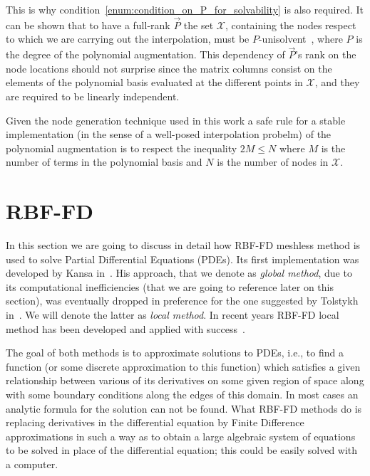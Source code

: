 This is why condition~\ref{enum:condition_on_P_for_solvability} is also required. It can be shown that to have a full-rank $\vec{P}$ the set $\mathcal{X}$, containing the nodes respect to which we are carrying out the interpolation, must be $P$-unisolvent~\cite{Fasshauer:details_on_basic_functions}, where $P$ is the degree of the polynomial augmentation. This dependency of $\vec{P}$'s rank on the node locations should not surprise since the matrix columns consist on the elements of the polynomial basis evaluated at the different points in $\mathcal{X}$, and they are required to be linearly independent.

Given the node generation technique used in this work a safe rule for a stable implementation (in the sense of a well-posed interpolation probelm) of the polynomial augmentation is to respect the inequality $2M \le N$ where $M$ is the number of terms in the polynomial basis and $N$ is the number of nodes in $\mathcal{X}$.



\section{RBF-FD}
\label{sec:RBF-FD}

In this section we are going to discuss in detail how RBF-FD meshless method is used to solve Partial Differential Equations (PDEs). Its first implementation was developed by Kansa in~\cite{Kansa:RBF_1,Kansa:RBF_2}. His approach, that we denote as \emph{global method}, due to its computational inefficiencies (that we are going to reference later on this section), was eventually dropped in preference for the one suggested by Tolstykh in~\cite{Tolstykh:RBF_local}. We will denote the latter as \emph{local method}. In recent years RBF-FD local method has been developed and applied with success~\cite{Bueno:RBF-FD_application_1,Bueno:RBF-FD_application_2,Kosec:RBF-FD_application_3,Kosec:RBF-FD_application_4}.

The goal of both methods is to approximate solutions to PDEs, i.e., to find a function (or some discrete
approximation to this function) which satisfies a given relationship between various of its derivatives on some given region of space along with some boundary conditions along the edges of this domain. In most cases an analytic formula for the solution can not be found.
What RBF-FD methods do is replacing derivatives in the differential equation by Finite Difference approximations in such a way as to obtain a large algebraic system of equations to be solved in place of the differential equation; this could be easily solved with a computer.



